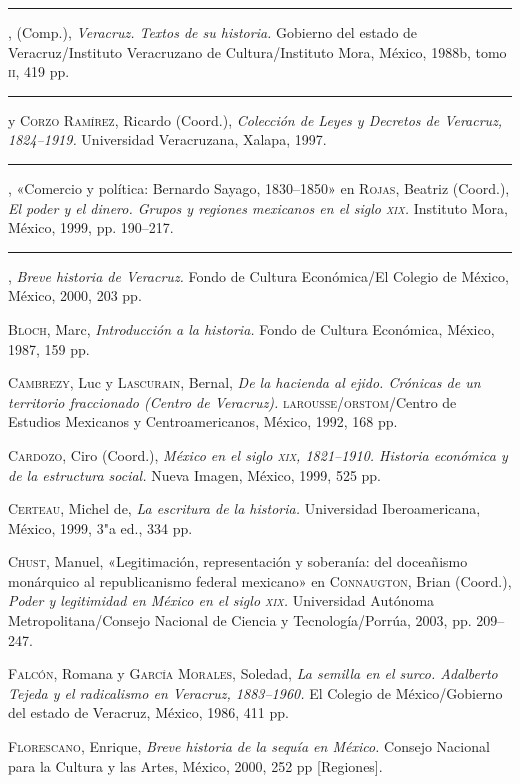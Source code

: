\documentclass[14pt,twoside,final]{extbook} %
\begin{document}
\rule{1cm}{0.4pt}, (Comp.), \emph{Veracruz. Textos de su historia.} Gobierno del estado de Veracruz/Instituto Veracruzano de Cultura/Instituto Mora, México, 1988b, tomo \textsc{ii}, 419 pp.

\rule{1cm}{0.4pt} y \textsc{Corzo Ramírez}, Ricardo (Coord.), \emph{Colección de Leyes y Decretos de Veracruz, 1824--1919.} Universidad Veracruzana, Xalapa, 1997.

\rule{1cm}{0.4pt}, «Comercio y política: Bernardo Sayago, 1830--1850» en \textsc{Rojas}, Beatriz (Coord.), \emph{El poder y el dinero. Grupos y regiones mexicanos en el siglo \textsc{xix}.} Instituto Mora, México, 1999, pp. 190--217.

\rule{1cm}{0.4pt}, \emph{Breve historia de Veracruz.} Fondo de Cultura Económica/El Colegio de México, México, 2000, 203 pp.

\textsc{Bloch}, Marc, \emph{Introducción a la historia.} Fondo de Cultura Económica, México, 1987, 159 pp.

\textsc{Cambrezy}, Luc y \textsc{Lascurain}, Bernal, \emph{De la hacienda al ejido. Crónicas de un territorio fraccionado (Centro de Veracruz).} \textsc{larousse/orstom}/Centro de Estudios Mexicanos y Centroamericanos, México, 1992, 168 pp.

\textsc{Cardozo}, Ciro (Coord.), \emph{México en el siglo \textsc{xix}, 1821--1910. Historia económica y de la estructura social.} Nueva Imagen, México, 1999, 525 pp.

\textsc{Certeau}, Michel de, \emph{La escritura de la historia.} Universidad Iberoamericana, México, 1999, 3"a ed., 334 pp.

\textsc{Chust}, Manuel, «Legitimación, representación y soberanía: del doceañismo monárquico al republicanismo federal mexicano» en \textsc{Connaugton}, Brian (Coord.), \emph{Poder y legitimidad en México en el siglo \textsc{xix}.} Universidad Autónoma Metropolitana/Consejo Nacional de Ciencia y Tecnología/Porrúa, 2003, pp. 209--247.

\textsc{Falcón}, Romana y \textsc{García Morales}, Soledad, \emph{La semilla en el surco. Adalberto Tejeda y el radicalismo en Veracruz, 1883--1960.} El Colegio de México/Gobierno del estado de Veracruz, México, 1986, 411 pp.

\textsc{Florescano}, Enrique, \emph{Breve historia de la sequía en México.} Consejo Nacional para la Cultura y las Artes, México, 2000, 252 pp [Regiones].
\end{document}
